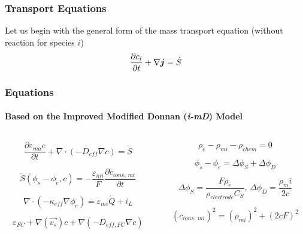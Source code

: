 
\begin{frame}
  \frametitle{Transport Equations}

  Let us begin with the general form of the
  mass transport equation (without reaction for species $i$)
  \[
  \frac{\partial c_i}{\partial t}
  + \nabla{\boldsymbol{j}}
  = \dot{S}
  \]
\end{frame}


\begin{frame}
  \frametitle{Equations}
  \framesubtitle{Based on the Improved Modified Donnan ({\it i-mD}) Model}
  \begin{columns}
    \begin{column}{0.5\textwidth}
      \[
      \frac{\partial \varepsilon_{ma} c}{\partial t}
      + \nabla \cdot \left( - D_{eff} \nabla{c}  \right)
      = \dot{S}
      \]

      \[
      \dot{S}(\phi_s - \phi_e, c) = - \frac{\varepsilon_{mi}}{F}
      \frac{\partial c_{ions,\,mi}}{\partial t}
      \]

      \[
      \nabla \cdot (- \kappa_{eff} \nabla \phi_e) = \varepsilon_{mi} \dot{Q} + i_L
      \]

      \[
      \varepsilon_{FC} + \nabla{(\vec{v_s}) c}
      + \nabla{(- D_{eff,FC} \nabla{c})}
      \]
    \end{column}

    \begin{column}{0.5\textwidth}  %

      \[
      \rho_e - \rho_{mi} - \rho_{chem} = 0
      \]

      \[
      \phi_s - \phi_e = \Delta \phi_S + \Delta \phi_D
      \]

      \[
      \Delta \phi_S = \frac{F \rho_e}{\rho_{electrode} C_S}, \,
      \Delta \phi_D = \frac{\rho_mi}{2c}
      \]

      \[
      (c_{ions,\,mi})^2 = (\rho_{mi})^2 + (2 c F)^2
      \]
    \end{column}
  \end{columns}
\end{frame}

